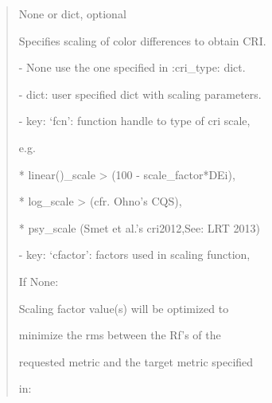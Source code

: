 \documentclass[letterpaper,10pt,english]{sphinxmanual}
\begin{document}
\begin{fulllineitems}
\begin{description}
\begin{quote}
\begin{description}
\item[{scale}] \leavevmode
\begin{DUlineblock}{0em}
\item[] None or dict, optional
\item[] Specifies scaling of color differences to obtain CRI.
\item[]
\begin{DUlineblock}{\DUlineblockindent}
\item[] - None use the one specified in :cri\_type: dict.
\item[] - dict: user specified dict with scaling parameters.
\item[]
\begin{DUlineblock}{\DUlineblockindent}
\item[]
\begin{DUlineblock}{\DUlineblockindent}
\item[] - key: ‘fcn’: function handle to type of cri scale, 
\item[]
\begin{DUlineblock}{\DUlineblockindent}
\item[] e.g. 
\item[] * linear()\_scale \textendash{}\textgreater{} (100 - scale\_factor*DEi), 
\item[] * log\_scale \textendash{}\textgreater{} (cfr. Ohno’s CQS), 
\item[] * psy\_scale (Smet et al.’s cri2012,See: LRT 2013)
\end{DUlineblock}
\end{DUlineblock}
\item[] - key: ‘cfactor’: factors used in scaling function, 
\item[]
\begin{DUlineblock}{\DUlineblockindent}
\item[] If None: 
\item[]
\begin{DUlineblock}{\DUlineblockindent}
\item[]
\begin{DUlineblock}{\DUlineblockindent}
\item[]
\begin{DUlineblock}{\DUlineblockindent}
\item[] Scaling factor value(s) will be optimized to 
\item[] minimize the rms between the Rf’s of the 
\item[] requested metric and the target metric specified
\item[] in:

\end{DUlineblock}
\end{DUlineblock}
\end{DUlineblock}
\end{DUlineblock}
\end{DUlineblock}
\end{DUlineblock}
\end{DUlineblock}
\end{description}
\end{quote}
\end{description}
\end{fulllineitems}
\end{document}
